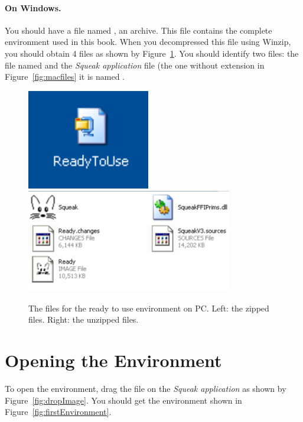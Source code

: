 \paragraph{On Windows.}
You should have a file named , an archive. This file contains the complete environment used in this book. When you decompressed this file using Winzip, you should obtain 4 files as shown by Figure~\ref{fig:pcfiles}. You should identify two files: the file named  and the \emph{Squeak application} file (the one without extension in Figure~\ref{fig:macfiles} it is named .


\begin{figure}[!h]\centerline{\includegraphics{zipPC}\includegraphics[width=9cm]{readyPC}} 
\caption{The files for the ready to use environment on PC. Left: the zipped files. Right: the unzipped files.\label{fig:pcfiles}}
\end{figure}


\section{Opening the Environment} 
To open the environment, drag the file  on the \emph{Squeak application} as shown by Figure~\ref{fig:dropImage}. You should get the environment shown in Figure~\ref{fig:firstEnvironment}.

